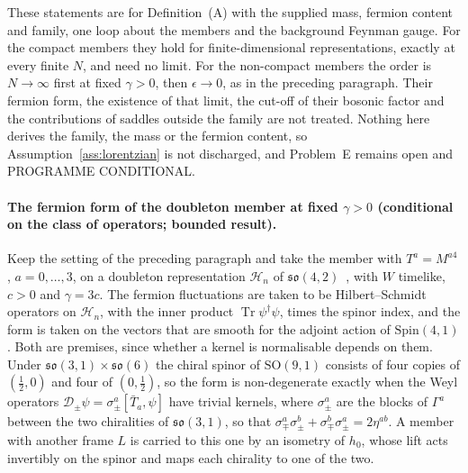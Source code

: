 These statements are for Definition~(A) with the supplied mass, fermion content and family, one loop about the members and the background Feynman gauge. For the compact members they hold for finite-dimensional representations, exactly at every finite \(N\), and need no limit. For the non-compact members the order is \(N\to\infty\) first at fixed \(\gamma>0\), then \(\epsilon\to0\), as in the preceding paragraph. Their fermion form, the existence of that limit, the cut-off of their bosonic factor and the contributions of saddles outside the family are not treated. Nothing here derives the family, the mass or the fermion content, so Assumption~\ref{ass:lorentzian} is not discharged, and Problem~E remains open and PROGRAMME CONDITIONAL.

\paragraph{The fermion form of the doubleton member at fixed \(\gamma>0\) (conditional on the class of operators; bounded result).}
Keep the setting of the preceding paragraph and take the member with \(T^a=M^{a4}\), \(a=0,\dots,3\), on a doubleton representation \(\mathcal H_n\) of \(\mathfrak{so}(4,2)\)~\cite{MantaSteinacker2025}, with \(W\) timelike, \(c>0\) and \(\gamma=3c\). The fermion fluctuations are taken to be Hilbert--Schmidt operators on \(\mathcal H_n\), with the inner product \(\operatorname{Tr}\psi^\dagger\psi\), times the spinor index, and the form is taken on the vectors that are smooth for the adjoint action of \(\mathrm{Spin}(4,1)\). Both are premises, since whether a kernel is normalisable depends on them. Under \(\mathfrak{so}(3,1)\times\mathfrak{so}(6)\) the chiral spinor of \(\mathrm{SO}(9,1)\) consists of four copies of \((\tfrac12,0)\) and four of \((0,\tfrac12)\), so the form is non-degenerate exactly when the Weyl operators \(\mathcal D_\pm\psi=\sigma_\pm^a[\bar T_a,\psi]\) have trivial kernels, where \(\sigma_\pm^a\) are the blocks of \(\Gamma^a\) between the two chiralities of \(\mathfrak{so}(3,1)\), so that \(\sigma_\mp^a\sigma_\pm^b+\sigma_\mp^b\sigma_\pm^a=2\eta^{ab}\). A member with another frame \(L\) is carried to this one by an isometry of \(h_0\), whose lift acts invertibly on the spinor and maps each chirality to one of the two.

